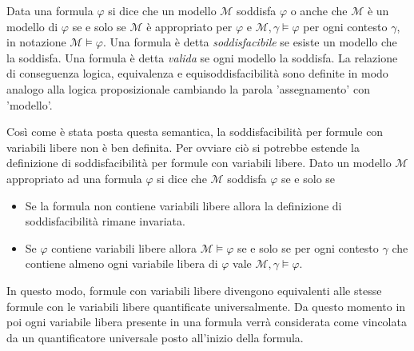 \documentclass[./main.tex]{subfiles}
\begin{document}
Data una formula $\varphi$ si dice che un modello $\mathcal{M}$ soddisfa $\varphi$ o anche che $\mathcal{M}$ 
è un modello di $\varphi$ se e solo se $\mathcal{M}$ è appropriato per $\varphi$ e $\mathcal{M}, \gamma \models \varphi$ per ogni contesto $\gamma$,
in notazione $\mathcal{M} \models \varphi$. Una formula è detta \textit{soddisfacibile} se esiste un modello che la soddisfa.
Una formula è detta \textit{valida} se ogni modello la soddisfa.
La relazione di conseguenza logica, equivalenza e equisoddisfacibilità sono definite in modo analogo alla logica proposizionale
cambiando la parola 'assegnamento' con 'modello'.


Così come è stata posta questa semantica, la soddisfacibilità per formule con variabili libere non è ben definita.
Per ovviare ciò si potrebbe estende la definizione di soddisfacibilità per formule con variabili libere.
Dato un modello $\mathcal{M}$ appropriato ad una formula $\varphi$ si dice che $\mathcal{M}$ soddisfa $\varphi$ se e solo se
\begin{itemize}
  \item Se la formula non contiene variabili libere allora la definizione di soddisfacibilità rimane invariata.
  \item Se $\varphi$ contiene variabili libere allora $\mathcal{M} \models \varphi$ se e solo se
  per ogni contesto $\gamma$ che contiene almeno ogni variabile libera di $\varphi$ vale $\mathcal{M}, \gamma \models \varphi$.
\end{itemize}

In questo modo, formule con variabili libere divengono 
equivalenti alle stesse formule con le variabili libere quantificate universalmente.
Da questo momento in poi ogni variabile libera presente in una formula verrà considerata come vincolata da un quantificatore universale posto all'inizio della formula.
\end{document}
